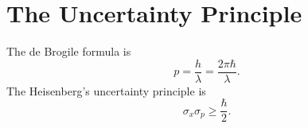 \documentclass[en, oneside]{vivi}
\begin{document}
\section{The Uncertainty Principle}
The de Brogile formula is
\begin{equation}
    p = \frac{h}{\lambda} = \frac{2 \pi \hbar}{\lambda}.
\end{equation}
The Heisenberg's uncertainty principle is
\begin{equation}
    \sigma_x \sigma_p \geq \frac{\hbar}{2}.
\end{equation}
\end{document}
